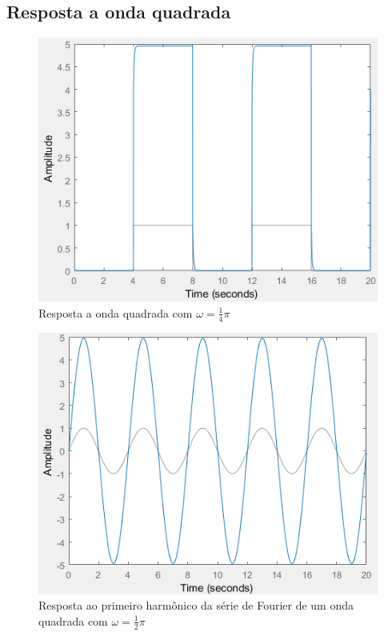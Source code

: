 \documentclass[a4paper, 12pt]{article}
\begin{document}
			\subsection{Resposta a onda quadrada}
			\begin{figure}[!ht]
				\centering
				\includegraphics[scale=0.71]{img/2h.png}
				\caption{Resposta a onda quadrada com $\omega = \frac{1}{4}\pi$}
			\end{figure}
			\begin{figure}[!ht]
				\centering
				\includegraphics[scale=0.71]{img/2i.png}
				\caption{Resposta ao primeiro harmônico da série de Fourier de um onda quadrada com $\omega = \frac{1}{2}\pi$}
			\end{figure}
\end{document}
